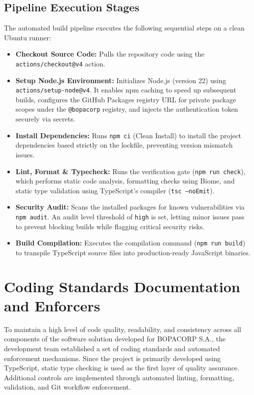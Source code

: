 \documentclass[letterpaper%
, oneside%
, 12pt%
, memoireprojet%
, english%
,creativecommons,hyperref, withAlgo2e %
]{thETS}
\begin{document}
\subsection{Pipeline Execution Stages}
The automated build pipeline executes the following sequential steps on a clean Ubuntu runner:
\begin{itemize}
    \item \textbf{Checkout Source Code:} Pulls the repository code using the \texttt{actions/checkout@v4} action.
    \item \textbf{Setup Node.js Environment:} Initializes Node.js (version 22) using \texttt{actions/setup-node@v4}. It enables npm caching to speed up subsequent builds, configures the GitHub Packages registry URL for private package scopes under the \texttt{@bopacorp} registry, and injects the authentication token securely via secrets.
    \item \textbf{Install Dependencies:} Runs \texttt{npm ci} (Clean Install) to install the project dependencies based strictly on the lockfile, preventing version mismatch issues.
    \item \textbf{Lint, Format \& Typecheck:} Runs the verification gate (\texttt{npm run check}), which performs static code analysis, formatting checks using Biome, and static type validation using TypeScript's compiler (\texttt{tsc --noEmit}).
    \item \textbf{Security Audit:} Scans the installed packages for known vulnerabilities via \texttt{npm audit}. An audit level threshold of \texttt{high} is set, letting minor issues pass to prevent blocking builds while flagging critical security risks.
    \item \textbf{Build Compilation:} Executes the compilation command (\texttt{npm run build}) to transpile TypeScript source files into production-ready JavaScript binaries.
\end{itemize}


\section{Coding Standards Documentation and Enforcers}

To maintain a high level of code quality, readability, and consistency across all components of the software solution developed for BOPACORP S.A., the development team established a set of coding standards and automated enforcement mechanisms. Since the project is primarily developed using TypeScript, static type checking is used as the first layer of quality assurance. Additional controls are implemented through automated linting, formatting, validation, and Git workflow enforcement.
\end{document}
